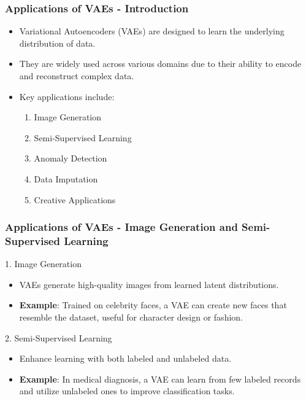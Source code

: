 \documentclass[aspectratio=169]{beamer}
\begin{document}
\begin{frame}[fragile]
    \frametitle{Applications of VAEs - Introduction}
    \begin{itemize}
        \item Variational Autoencoders (VAEs) are designed to learn the underlying distribution of data.
        \item They are widely used across various domains due to their ability to encode and reconstruct complex data.
        \item Key applications include:
            \begin{enumerate}
                \item Image Generation
                \item Semi-Supervised Learning
                \item Anomaly Detection
                \item Data Imputation
                \item Creative Applications
            \end{enumerate}
    \end{itemize}
\end{frame}

\begin{frame}[fragile]
    \frametitle{Applications of VAEs - Image Generation and Semi-Supervised Learning}
    \begin{block}{1. Image Generation}
        \begin{itemize}
            \item VAEs generate high-quality images from learned latent distributions.
            \item \textbf{Example}: Trained on celebrity faces, a VAE can create new faces that resemble the dataset, useful for character design or fashion.
        \end{itemize}
    \end{block}
    
    \begin{block}{2. Semi-Supervised Learning}
        \begin{itemize}
            \item Enhance learning with both labeled and unlabeled data.
            \item \textbf{Example}: In medical diagnosis, a VAE can learn from few labeled records and utilize unlabeled ones to improve classification tasks.
        \end{itemize}
    \end{block}
\end{frame}
\end{document}
